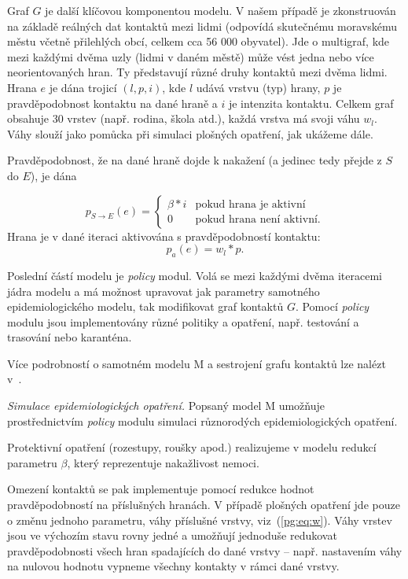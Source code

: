 Graf $G$ je další klíčovou komponentou modelu. V našem případě je
zkonstruován na základě reálných dat kontaktů mezi lidmi (odpovídá
skutečnému moravskému městu včetně přilehlých obcí, celkem cca 56 000
obyvatel). Jde o multigraf, kde mezi každými dvěma uzly (lidmi v daném
městě) může vést jedna nebo více neorientovaných hran. Ty představují
různé druhy kontaktů mezi dvěma lidmi. Hrana $e$ je dána trojicí $(l,
p, i)$, kde $l$ udává vrstvu (typ) hrany, $p$ je pravděpodobnost
kontaktu na dané hraně a $i$ je intenzita kontaktu. Celkem graf
obsahuje 30 vrstev (např. rodina, škola atd.), každá vrstva má svoji
váhu $w_l$. Váhy slouží jako pomůcka při simulaci plošných opatření,
jak ukážeme dále.

Pravděpodobnost, že na dané hraně dojde k nakažení (a jedinec tedy přejde z $S$
do $E$), je dána

\begin{equation}
  p_{S \rightarrow E}(e) = \begin{cases}
    \beta * i  & \mbox{pokud hrana je aktivní} \\
    0          & \mbox{pokud hrana není aktivní.} 
    \end{cases}
\end{equation}
Hrana je v dané iteraci aktivována s pravděpodobností kontaktu:
\begin{equation}
\label{pg:eq:w}
p_a(e) = w_l * p.
\end{equation}

Poslední částí modelu je {\em policy} modul. Volá se mezi každými dvěma
iteracemi jádra modelu a má možnost upravovat jak parametry samotného
epidemiologického modelu, tak modifikovat graf kontaktů $G$. Pomocí {\em policy} modulu
jsou implementovány různé politiky a opatření, např. testování a
trasování nebo karanténa. 

Více podrobností o samotném modelu M a sestrojení grafu kontaktů lze nalézt v~\cite{pg:modelM}.

\emph{Simulace epidemiologických opatření.} Popsaný model M umožňuje prostřednictvím {\em policy} modulu simulaci různorodých epidemiologických opatření.

Protektivní opatření (rozestupy, roušky apod.) realizujeme v modelu
redukcí parametru $\beta$, který reprezentuje nakažlivost nemoci.

Omezení kontaktů se pak implementuje pomocí redukce hodnot
pravděpodobností na příslušných hranách. V případě plošných opatření
jde pouze o změnu jednoho parametru, váhy příslušné vrstvy,
viz~(\ref{pg:eq:w}). Váhy vrstev jsou ve výchozím stavu rovny jedné a
umožňují jednoduše redukovat pravděpodobnosti všech hran spadajících
do dané vrstvy --  např. nastavením váhy na nulovou hodnotu vypneme
všechny kontakty v rámci dané vrstvy.

